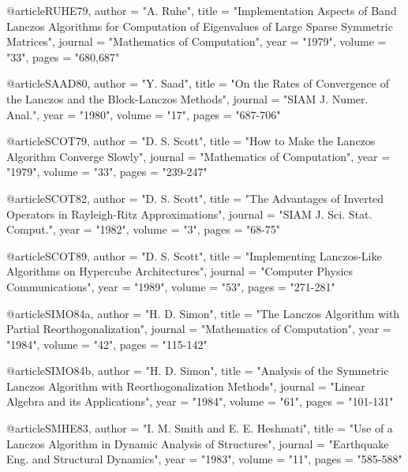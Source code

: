 @article{RUHE79,
   author       = "A. Ruhe",
   title        = "{Implementation Aspects of Band Lanczos 
                   Algorithms for Computation of Eigenvalues
                   of Large Sparse Symmetric Matrices}",
   journal      = "Mathematics of Computation",
   year         = "1979",
   volume       = "33",
   pages        = "680,687"}

@article{SAAD80,
   author       = "Y. Saad",
   title        = "{On the Rates of Convergence of the Lanczos
                   and the Block-Lanczos Methods}",
   journal      = "SIAM J. Numer. Anal.",
   year         = "1980",
   volume       = "17",
   pages        = "687-706"}

@article{SCOT79,
   author       = "D. S. Scott",
   title        = "{How to Make the Lanczos Algorithm Converge Slowly}",
   journal      = "Mathematics of Computation",
   year         = "1979",
   volume       = "33",
   pages        = "239-247"}

@article{SCOT82,
   author       = "D. S. Scott",
   title        = "{The Advantages of Inverted Operators in
                   Rayleigh-Ritz Approximations}",
   journal      = "SIAM J. Sci. Stat. Comput.",
   year         = "1982",
   volume       = "3",
   pages        = "68-75"}

@article{SCOT89,
   author       = "D. S. Scott",
   title        = "{Implementing Lanczos-Like Algorithms
                   on Hypercube Architectures}",
   journal      = "Computer Physics Communications",
   year         = "1989",
   volume       = "53",
   pages        = "271-281"}

@article{SIMO84a,
   author       = "H. D. Simon",
   title        = "{The Lanczos Algorithm with Partial
                   Reorthogonalization}",
   journal      = "Mathematics of Computation",
   year         = "1984",
   volume       = "42",
   pages        = "115-142"}

@article{SIMO84b,
   author       = "H. D. Simon",
   title        = "{Analysis of the Symmetric Lanczos Algorithm
                   with Reorthogonalization Methods}",
   journal      = "Linear Algebra and its Applications",
   year         = "1984",
   volume       = "61",
   pages        = "101-131"}

@article{SMHE83,
   author       = "I. M. Smith and E. E. Heshmati",
   title        = "{Use of a Lanczos Algorithm in Dynamic 
                   Analysis of Structures}",
   journal      = "Earthquake Eng. and Structural Dynamics",
   year         = "1983",
   volume       = "11",
   pages        = "585-588"}

